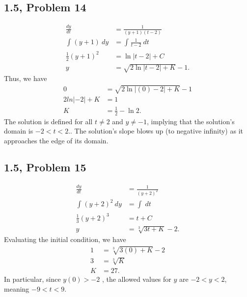 \documentclass[10pt]{mypackage}
\begin{document}
\subsection{1.5, Problem 14}%
\begin{align*}
  \frac{dy}{dt} &= \frac{1}{\left(y+1\right)\left(t-2\right)}\\
  \int_{}^{} \left(y + 1\right)\:dy &= \int_{}^{} \frac{1}{t-2}\:dt\\
  \frac{1}{2}\left(y+1\right)^2 &= \ln \left\vert t-2 \right\vert + C\\
  y &= \sqrt{ 2\ln \left\vert t-2 \right\vert + K} - 1.
\end{align*}
Thus, we have
\begin{align*}
  0 &= \sqrt{2\ln \left\vert (0)-2 \right\vert + K} - 1\\
  2ln\left\vert -2 \right\vert + K &= 1\\
  K &= \frac{1}{2}-\ln 2.
\end{align*}
The solution is defined for all $t \neq 2$ and $y \neq -1$, implying that the solution's domain is $-2 < t < 2$.. The solution's slope blows up (to negative infinity) as it approaches the edge of its domain.
\subsection{1.5, Problem 15}%
\begin{align*}
  \frac{dy}{dt} &= \frac{1}{\left(y+2\right)^2}\\
  \int_{}^{} \left(y+2\right)^2\:dy &= \int_{}^{} \:dt\\
  \frac{1}{3}\left(y+2\right)^3 &= t + C\\
  y &= \sqrt[3]{3t + K} - 2.
\end{align*}
Evaluating the initial condition, we have
\begin{align*}
  1 &= \sqrt[3]{3(0) + K} - 2\\
  3 &= \sqrt[3]{K}\\
  K &= 27.
\end{align*}
In particular, since $y(0) > -2$ , the allowed values for $y$ are $-2 < y < 2$, meaning $-9 < t < 9$.
\end{document}
